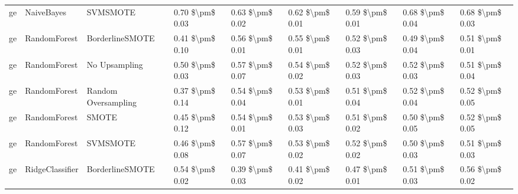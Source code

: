 \begin{tabular}{lllllllll}
      ge &                      NaiveBayes &                      SVMSMOTE &     0.70 \$\textbackslash pm\$ 0.03 &           0.63 \$\textbackslash pm\$ 0.02 &       0.62 \$\textbackslash pm\$ 0.01 &        0.59 \$\textbackslash pm\$ 0.01 &                         0.68 \$\textbackslash pm\$ 0.04 &     0.68 \$\textbackslash pm\$ 0.03 \\
      ge &                    RandomForest &               BorderlineSMOTE &     0.41 \$\textbackslash pm\$ 0.10 &           0.56 \$\textbackslash pm\$ 0.01 &       0.55 \$\textbackslash pm\$ 0.01 &        0.52 \$\textbackslash pm\$ 0.03 &                         0.49 \$\textbackslash pm\$ 0.04 &     0.51 \$\textbackslash pm\$ 0.01 \\
      ge &                    RandomForest &                 No Upsampling &     0.50 \$\textbackslash pm\$ 0.03 &           0.57 \$\textbackslash pm\$ 0.07 &       0.54 \$\textbackslash pm\$ 0.02 &        0.52 \$\textbackslash pm\$ 0.03 &                         0.52 \$\textbackslash pm\$ 0.03 &     0.51 \$\textbackslash pm\$ 0.04 \\
      ge &                    RandomForest &           Random Oversampling &     0.37 \$\textbackslash pm\$ 0.14 &           0.54 \$\textbackslash pm\$ 0.04 &       0.53 \$\textbackslash pm\$ 0.01 &        0.51 \$\textbackslash pm\$ 0.04 &                         0.52 \$\textbackslash pm\$ 0.04 &     0.52 \$\textbackslash pm\$ 0.05 \\
      ge &                    RandomForest &                         SMOTE &     0.45 \$\textbackslash pm\$ 0.12 &           0.54 \$\textbackslash pm\$ 0.01 &       0.53 \$\textbackslash pm\$ 0.03 &        0.51 \$\textbackslash pm\$ 0.02 &                         0.50 \$\textbackslash pm\$ 0.05 &     0.52 \$\textbackslash pm\$ 0.05 \\
      ge &                    RandomForest &                      SVMSMOTE &     0.46 \$\textbackslash pm\$ 0.08 &           0.57 \$\textbackslash pm\$ 0.07 &       0.53 \$\textbackslash pm\$ 0.02 &        0.52 \$\textbackslash pm\$ 0.02 &                         0.50 \$\textbackslash pm\$ 0.03 &     0.51 \$\textbackslash pm\$ 0.03 \\
      ge &                 RidgeClassifier &               BorderlineSMOTE &     0.54 \$\textbackslash pm\$ 0.02 &           0.39 \$\textbackslash pm\$ 0.03 &       0.41 \$\textbackslash pm\$ 0.02 &        0.47 \$\textbackslash pm\$ 0.01 &                         0.51 \$\textbackslash pm\$ 0.03 &     0.56 \$\textbackslash pm\$ 0.02 \\

\end{tabular}
